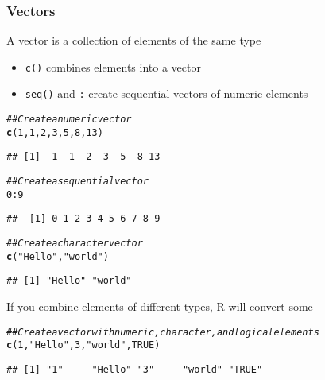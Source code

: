 \documentclass{beamer}\usepackage[]{graphicx}\usepackage[]{color}
\makeatletter
\newcommand{\hlnum}[1]{\textcolor[rgb]{0.686,0.059,0.569}{#1}}%
\newcommand{\hlstr}[1]{\textcolor[rgb]{0.192,0.494,0.8}{#1}}%
\newcommand{\hlcom}[1]{\textcolor[rgb]{0.678,0.584,0.686}{\textit{#1}}}%
\newcommand{\hlopt}[1]{\textcolor[rgb]{0,0,0}{#1}}%
\newcommand{\hlstd}[1]{\textcolor[rgb]{0.345,0.345,0.345}{#1}}%
\newcommand{\hlkwd}[1]{\textcolor[rgb]{0.737,0.353,0.396}{\textbf{#1}}}%
\newenvironment{kframe}{%
 \def\at@end@of@kframe{}%
 \ifinner\ifhmode%
  \def\at@end@of@kframe{\end{minipage}}%
  \begin{minipage}{\columnwidth}%
 \fi\fi%
 \def\FrameCommand##1{\hskip\@totalleftmargin \hskip-\fboxsep
 \colorbox{shadecolor}{##1}\hskip-\fboxsep
     \hskip-\linewidth \hskip-\@totalleftmargin \hskip\columnwidth}%
 \MakeFramed {\advance\hsize-\width
   \@totalleftmargin\z@ \linewidth\hsize
   \@setminipage}}%
 {\par\unskip\endMakeFramed%
 \at@end@of@kframe}
\newenvironment{knitrout}{}{} %
\makeatother
\begin{document}
\begin{frame}[fragile]\frametitle{Vectors}
    A vector is a collection of elements of the same type
    \begin{itemize}
        \item \texttt{c()} combines elements into a vector
        \item \texttt{seq()} and \texttt{:} create sequential vectors of numeric elements
    \end{itemize}
\begin{knitrout}\footnotesize
{}\color{fgcolor}\begin{kframe}
\begin{alltt}
\hlcom{## Create a numeric vector}
\hlkwd{c}\hlstd{(}\hlnum{1}\hlstd{,} \hlnum{1}\hlstd{,} \hlnum{2}\hlstd{,} \hlnum{3}\hlstd{,} \hlnum{5}\hlstd{,} \hlnum{8}\hlstd{,} \hlnum{13}\hlstd{)}
\end{alltt}
\begin{verbatim}
## [1]  1  1  2  3  5  8 13
\end{verbatim}
\begin{alltt}
\hlcom{## Create a sequential vector}
\hlnum{0}\hlopt{:}\hlnum{9}
\end{alltt}
\begin{verbatim}
##  [1] 0 1 2 3 4 5 6 7 8 9
\end{verbatim}
\begin{alltt}
\hlcom{## Create a character vector}
\hlkwd{c}\hlstd{(}\hlstr{"Hello"}\hlstd{,} \hlstr{"world"}\hlstd{)}
\end{alltt}
\begin{verbatim}
## [1] "Hello" "world"
\end{verbatim}
\end{kframe}
\end{knitrout}
    \vspace{2ex} 
    If you combine elements of different types, R will convert some
\begin{knitrout}\footnotesize
{}\color{fgcolor}\begin{kframe}
\begin{alltt}
\hlcom{## Create a vector with numeric, character, and logical elements}
\hlkwd{c}\hlstd{(}\hlnum{1}\hlstd{,} \hlstr{"Hello"}\hlstd{,} \hlnum{3}\hlstd{,} \hlstr{"world"}\hlstd{,} \hlnum{TRUE}\hlstd{)}
\end{alltt}
\begin{verbatim}
## [1] "1"     "Hello" "3"     "world" "TRUE"
\end{verbatim}
\end{kframe}
\end{knitrout}
\end{frame}
\end{document}
